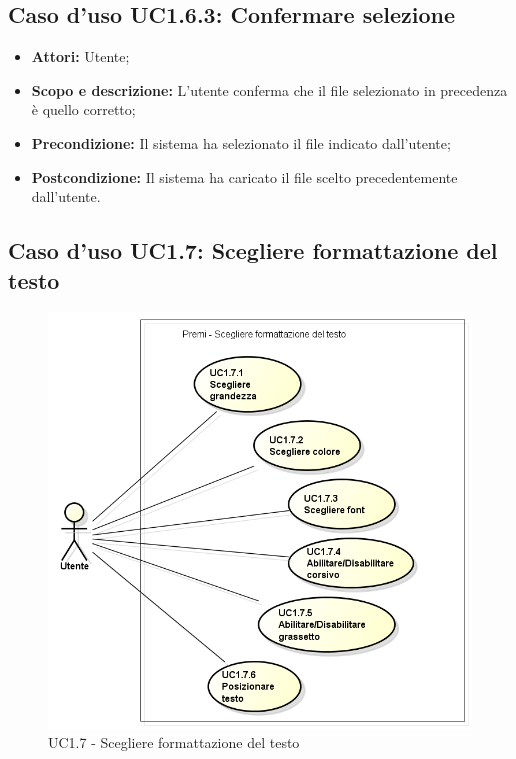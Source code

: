 \subsection{Caso d'uso UC1.6.3: Confermare selezione}
\begin{itemize}
	\item \textbf{Attori:} Utente;
	\item \textbf{Scopo e descrizione:} L'utente conferma che il file selezionato in precedenza è quello corretto;
	\item \textbf{Precondizione:} Il sistema ha selezionato il file indicato dall'utente;
	\item \textbf{Postcondizione:} Il sistema ha caricato il file scelto precedentemente dall'utente.
\end{itemize}

\subsection{Caso d'uso UC1.7: Scegliere formattazione del testo}
\begin{figure}[h] 
	\centering 
	\includegraphics[scale=0.45] {img/UC1.7.png} 
	\caption{UC1.7 - Scegliere formattazione del testo} 
\end{figure}


